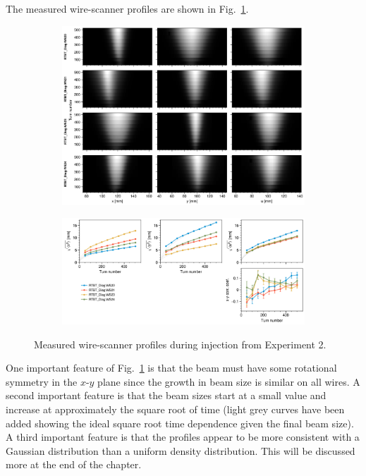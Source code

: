 The measured wire-scanner profiles are shown in Fig.~\ref{fig:exp2_wsmeas}.
%
\begin{figure}[!p]
    \centering
    \begin{subfigure}{\textwidth}
        \includegraphics[width=\textwidth]{Images/chapter5/exp2/waterfall.png}
    \end{subfigure}
    \vfill
    \vspace*{1.25cm}
    \vfill
    \begin{subfigure}{\textwidth}
        \includegraphics[width=\textwidth]{Images/chapter5/exp2/rms.png}
    \end{subfigure}
    \caption{Measured wire-scanner profiles during injection from Experiment 2.}
    \label{fig:exp2_wsmeas}
\end{figure}
%
One important feature of Fig.~\ref{fig:exp2_wsmeas} is that the beam must have some rotational symmetry in the $x$-$y$ plane since the growth in beam size is similar on all wires. A second important feature is that the beam sizes start at a small value and increase at approximately the square root of time (light grey curves have been added showing the ideal square root time dependence given the final beam size). A third important feature is that the profiles appear to be more consistent with a Gaussian distribution than a uniform density distribution. This will be discussed more at the end of the chapter.

